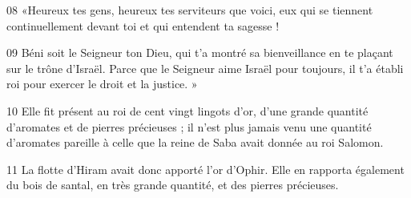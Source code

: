 
08 «Heureux tes gens, heureux tes serviteurs que voici, eux qui se tiennent continuellement devant toi et qui entendent ta sagesse !

09 Béni soit le Seigneur ton Dieu, qui t’a montré sa bienveillance en te plaçant sur le trône d’Israël. Parce que le Seigneur aime Israël pour toujours, il t’a établi roi pour exercer le droit et la justice. »

10 Elle fit présent au roi de cent vingt lingots d’or, d’une grande quantité d’aromates et de pierres précieuses ; il n’est plus jamais venu une quantité d’aromates pareille à celle que la reine de Saba avait donnée au roi Salomon.

11 La flotte d’Hiram avait donc apporté l’or d’Ophir. Elle en rapporta également du bois de santal, en très grande quantité, et des pierres précieuses.